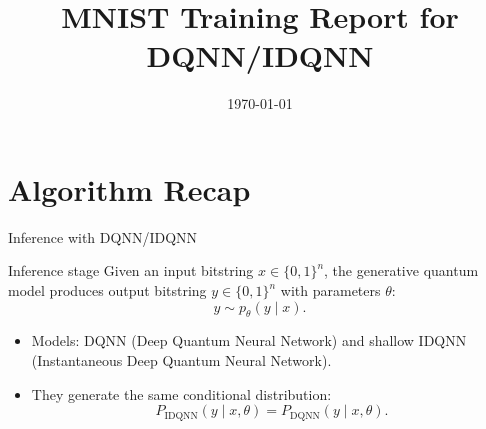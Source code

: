 \documentclass[aspectratio=169]{beamer}
\title{MNIST Training Report for DQNN/IDQNN}
\author{}
\institute{Quantum Machine Learning}
\date{\today}
\begin{document}
\begin{frame}
  \maketitle
\end{frame}



\section{Algorithm Recap}

\begin{frame}{Inference with DQNN/IDQNN}
  \begin{block}{Inference stage}
    Given an input bitstring $x\in\{0,1\}^n$, the generative quantum model produces output bitstring $y\in\{0,1\}^n$ with parameters $\theta$:
    \[
      y \sim p_\theta(y\mid x).
    \]
  \end{block}

  \begin{itemize}
    \item Models: DQNN (Deep Quantum Neural Network) and shallow IDQNN (Instantaneous Deep Quantum Neural Network).
    \item They generate the same conditional distribution:
    \[
      P_{\mathrm{IDQNN}}(y\mid x,\theta)=P_{\mathrm{DQNN}}(y\mid x,\theta).
    \]
  \end{itemize}
\end{frame}
\end{document}
